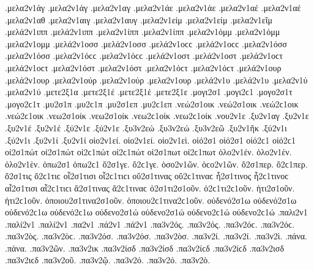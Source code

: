 {.μελα2ν1άγ .μελα2ν1άγ   %
.μελα2ν1αγ
.μελα2ν1άε .μελα2ν1άε   %
.μελα2ν1αέ .μελα2ν1αέ
.μελα2ν1αθ   %
.μελα2ν1αιγ   %
.μελα2ν1αυγ   %
.μελα2ν1είμ .μελα2ν1είμ   %
.μελα2ν1εῖμ   %
.μελά2ν1ιππ .μελά2ν1ιππ   %
.μελα2ν1ίππ .μελα2ν1ίππ
.μελα2ν1όμμ .μελα2ν1όμμ   %
.μελα2ν1ομμ
.μελά2ν1οσσ .μελά2ν1οσσ .μελά2ν1οϲϲ .μελά2ν1οϲϲ   %
.μελα2ν1όσσ .μελα2ν1όσσ .μελα2ν1όϲϲ .μελα2ν1όϲϲ
.μελά2ν1οστ .μελά2ν1οστ .μελά2ν1οϲτ .μελά2ν1οϲτ   %
.μελα2ν1όστ .μελα2ν1όστ .μελα2ν1όϲτ .μελα2ν1όϲτ
.μελά2ν1ουρ .μελά2ν1ουρ   %
.μελα2ν1ούρ .μελα2ν1ούρ
.μελα2ν1ουρ   %
.μελά2ν1υ .μελά2ν1υ   %
.μελα2ν1ύ .μελα2ν1ύ
.μετε2ξ1α   %
.μετε2ξ1έ .μετε2ξ1έ   %
.μετε2ξ1ε
.μογι2σ1 .μογι2ϲ1   %
.μογο2σ1τ .μογο2ϲ1τ   %
.μυ2σ1π .μυ2ϲ1π   %
.μυ2σ1επ .μυ2ϲ1επ   %
.νεώ2σ1οικ .νεώ2σ1οικ .νεώ2ϲ1οικ .νεώ2ϲ1οικ   %
.νεω2σ1οίκ .νεω2σ1οίκ .νεω2ϲ1οίκ .νεω2ϲ1οίκ
.νου2ν1ε   %
.ξυ2ν1αγ   %
.ξυ2ν1ε
.ξυ2ν1έ .ξυ2ν1έ
.ξύ2ν1ε .ξύ2ν1ε
.ξυ3ν2εώ .ξυ3ν2εώ   %
.ξυ3ν2εῶ
.ξυ2ν1ῆκ   %
.ξύ2ν1ι .ξύ2ν1ι   %
.ξυ2ν1ί .ξυ2ν1ί   %
οἱο2ν1εί. οἱο2ν1εί.   %
οἱο2ν1εὶ.
οἱό2σ1 οἱό2σ1 οἱό2ϲ1 οἱό2ϲ1   %
οἰ2σ1πώτ οἰ2σ1πώτ οἰ2ϲ1πώτ οἰ2ϲ1πώτ   %
οἰ2σ1πωτ οἰ2ϲ1πωτ
ὁλο2ν1έν. ὁλο2ν1έν.
ὁλο2ν1ὲν.
ὁπω2σ1 ὁπω2ϲ1   %
ὅ2σ1γε. ὅ2ϲ1γε.   %
ὁσο2ν1ῶν. ὁϲο2ν1ῶν.   %
ὅ2σ1περ. ὅ2ϲ1περ.   %
ὅ2σ1τις ὅ2ϲ1τιϲ   %
οἷ2σ1τισι οἷ2ϲ1τιϲι   %
οὕ2σ1τινας οὕ2ϲ1τιναϲ   %
ἧ2σ1τινος ἧ2ϲ1τινοϲ   %
αἷ2σ1τισι αἷ2ϲ1τιϲι   %
ἅ2σ1τινας ἅ2ϲ1τιναϲ   %
ὁ2σ1τι2σ1οῦν. ὁ2ϲ1τι2ϲ1οῦν.   %
ἡτι2σ1οῦν. ἡτι2ϲ1οῦν.   %
ὁποιου2σ1τινα2σ1οῦν. ὁποιου2ϲ1τινα2ϲ1οῦν.   %
οὐδενό2σ1ω οὐδενό2σ1ω οὐδενό2ϲ1ω οὐδενό2ϲ1ω   %
οὐδενο2σ1ώ οὐδενο2σ1ώ οὐδενο2ϲ1ώ οὐδενο2ϲ1ώ
.παλι2ν1   %
.παλί2ν1 .παλί2ν1   %
.πα2ν1
.πά2ν1 .πά2ν1
.πα3ν2ός. .πα3ν2ός. .πα3ν2όϲ. .πα3ν2όϲ.   %
.πα3ν2ὸς. .πα3ν2ὸϲ.
.πα3ν2όσ. .πα3ν2όσ.
.πα3ν2ὸσ.
.πα3ν2ί. .πα3ν2ί.
.πα3ν2ὶ.
.πάνα. .πάνα.
.πα3ν2ῶν.
.πα3ν2ικ   %
.πα3ν2ίσδ .πα3ν2ίσδ .πα3ν2ίϲδ .πα3ν2ίϲδ   %
.πα3ν2ισδ .πα3ν2ιϲδ   %
.πα3ν2οῦ.   %
.πα3ν2ῷ.
.πα3ν2ό. .πα3ν2ό.
.πα3ν2ὸ.
}

